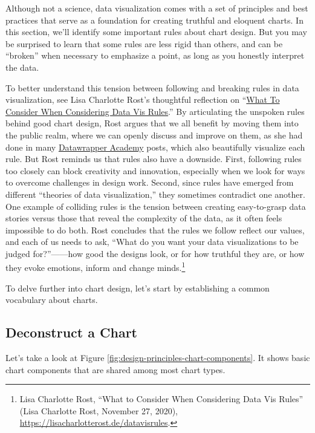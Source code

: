 \documentclass[
  english,
]{book}
\begin{document}
Although not a science, data visualization comes with a set of principles and best practices that serve as a foundation for creating truthful and eloquent charts. In this section, we'll identify some important rules about chart design. But you may be surprised to learn that some rules are less rigid than others, and can be ``broken'' when necessary to emphasize a point, as long as you honestly interpret the data.

To better understand this tension between following and breaking rules in data visualization, see Lisa Charlotte Rost's thoughtful reflection on ``\href{https://lisacharlotterost.de/datavisrules}{What To Consider When Considering Data Vis Rules}.'' By articulating the unspoken rules behind good chart design, Rost argues that we all benefit by moving them into the public realm, where we can openly discuss and improve on them, as she had done in many \href{https://academy.datawrapper.de}{Datawrapper Academy} posts, which also beautifully visualize each rule. But Rost reminds us that rules also have a downside. First, following rules too closely can block creativity and innovation, especially when we look for ways to overcome challenges in design work. Second, since rules have emerged from different ``theories of data visualization,'' they sometimes contradict one another. One example of colliding rules is the tension between creating easy-to-grasp data stories versus those that reveal the complexity of the data, as it often feels impossible to do both. Rost concludes that the rules we follow reflect our values, and each of us needs to ask, ``What do you want your data visualizations to be judged for?''------how good the designs look, or for how truthful they are, or how they evoke emotions, inform and change minds.\footnote{Lisa Charlotte Rost, {``What to {Consider When Considering Data Vis Rules}''} ({Lisa Charlotte Rost}, November 27, 2020), \url{https://lisacharlotterost.de/datavisrules}.}

To delve further into chart design, let's start by establishing a common vocabulary about charts.

\hypertarget{deconstruct-a-chart}{%
\subsection*{Deconstruct a Chart}\label{deconstruct-a-chart}}

Let's take a look at Figure \ref{fig:design-principles-chart-components}.
It shows basic chart components that are shared among most chart types.
\end{document}
